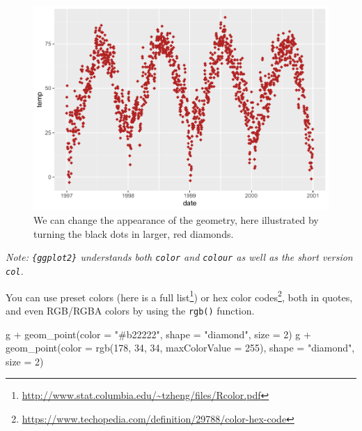 \documentclass[
]{krantz}
\makeatletter
\newenvironment{Shaded}{\begin{snugshade}}{\end{snugshade}}
\newcommand{\AttributeTok}[1]{\textcolor[rgb]{0.61,0.61,0.61}{#1}}
\newcommand{\DecValTok}[1]{\textcolor[rgb]{0.06,0.06,0.06}{#1}}
\newcommand{\FunctionTok}[1]{\textcolor[rgb]{0,0,0}{#1}}
\newcommand{\NormalTok}[1]{#1}
\newcommand{\SpecialCharTok}[1]{\textcolor[rgb]{0,0,0}{#1}}
\newcommand{\StringTok}[1]{\textcolor[rgb]{0.5,0.5,0.5}{#1}}
\renewcommand{\href}[2]{#2\footnote{\url{#1}}}
\newenvironment{kframe}{%
\medskip{}
\setlength{\fboxsep}{.8em}
 \def\at@end@of@kframe{}%
 \ifinner\ifhmode%
  \def\at@end@of@kframe{\end{minipage}}%
  \begin{minipage}{\columnwidth}%
 \fi\fi%
 \def\FrameCommand##1{\hskip\@totalleftmargin \hskip-\fboxsep
 \colorbox{shadecolor}{##1}\hskip-\fboxsep
     \hskip-\linewidth \hskip-\@totalleftmargin \hskip\columnwidth}%
 \MakeFramed {\advance\hsize-\width
   \@totalleftmargin\z@ \linewidth\hsize
   \@setminipage}}%
 {\par\unskip\endMakeFramed%
 \at@end@of@kframe}
\renewenvironment{Shaded}{\begin{kframe}}{\end{kframe}}
\makeatother
\begin{document}
\begin{figure}
\centering
\includegraphics{bookdown_files/figure-latex/ggplot-default-col-size-shape-1.pdf}
\caption{\label{fig:ggplot-default-col-size-shape}We can change the appearance of the geometry, here illustrated by turning the black dots in larger, red diamonds.}
\end{figure}

\emph{Note: \texttt{\{ggplot2\}} understands both \texttt{color} and \texttt{colour} as well as the short version \texttt{col}.}

You can use preset colors (here is a \href{http://www.stat.columbia.edu/~tzheng/files/Rcolor.pdf}{full list}) or \href{https://www.techopedia.com/definition/29788/color-hex-code}{hex color codes}, both in quotes, and even RGB/RGBA colors by using the \texttt{rgb()} function.

\begin{Shaded}
\begin{Highlighting}[]
\NormalTok{g }\SpecialCharTok{+} \FunctionTok{geom\_point}\NormalTok{(}\AttributeTok{color =} \StringTok{"\#b22222"}\NormalTok{, }\AttributeTok{shape =} \StringTok{"diamond"}\NormalTok{, }\AttributeTok{size =} \DecValTok{2}\NormalTok{)}
\NormalTok{g }\SpecialCharTok{+} \FunctionTok{geom\_point}\NormalTok{(}\AttributeTok{color =} \FunctionTok{rgb}\NormalTok{(}\DecValTok{178}\NormalTok{, }\DecValTok{34}\NormalTok{, }\DecValTok{34}\NormalTok{, }\AttributeTok{maxColorValue =} \DecValTok{255}\NormalTok{), }\AttributeTok{shape =} \StringTok{"diamond"}\NormalTok{, }\AttributeTok{size =} \DecValTok{2}\NormalTok{)}
\end{Highlighting}
\end{Shaded}
\end{document}
